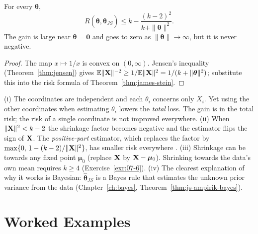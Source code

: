 \documentclass[main.tex]{subfiles}
\begin{document}
\begin{corollary}\label{cor:js-sinir}
For every $\bm\theta$,
\[
R(\bm\theta,\hat{\bm\theta}_{JS})\le k-\frac{(k-2)^2}{k+\|\bm\theta\|^2}.
\]
The gain is large near $\bm\theta=\mathbf 0$ and goes to zero as $\|\bm\theta\|\to\infty$, but it is never negative.
\end{corollary}
\begin{proof}
The map $x\mapsto1/x$ is convex on $(0,\infty)$. Jensen's inequality (Theorem~\ref{thm:jensen}) gives $\mathbb{E}\|\mathbf{X}\|^{-2}\ge1/\mathbb{E}\|\mathbf{X}\|^2=1/(k+\|\bm\theta\|^2)$; substitute this into the risk formula of Theorem~\ref{thm:james-stein}.
\end{proof}

\begin{remark}\label{rem:stein-paradoks}
(i) The coordinates are independent and each $\theta_i$ concerns only $X_i$. Yet using the other coordinates when estimating $\theta_i$ lowers the \emph{total} loss. The gain is in the total risk; the risk of a single coordinate is not improved everywhere. (ii) When $\|\mathbf{X}\|^2<k-2$ the shrinkage factor becomes negative and the estimator flips the sign of $\mathbf{X}$. The \emph{positive-part} estimator, which replaces the factor by $\max\{0,\,1-(k-2)/\|\mathbf{X}\|^2\}$, has smaller risk everywhere \cite[Chapter~5]{lehmann-casella}. (iii) Shrinkage can be towards any fixed point $\bm\mu_0$ (replace $\mathbf{X}$ by $\mathbf{X}-\bm\mu_0$). Shrinking towards the data's own mean requires $k\ge4$ (Exercise~\ref{exr:07-6}). (iv) The clearest explanation of why it works is Bayesian: $\hat{\bm\theta}_{JS}$ is a Bayes rule that estimates the unknown prior variance from the data (Chapter~\ref{ch:bayes}, Theorem~\ref{thm:js-ampirik-bayes}).
\end{remark}

\section{Worked Examples}
\end{document}
